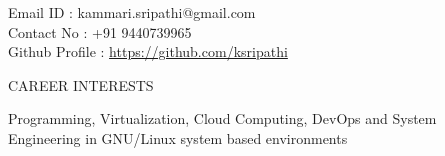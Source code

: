 \documentclass{resume} %
\newcommand{\blank}[1]{\hspace*{#1}}
\begin{document}
\blank{5 cm}
{Email ID} \blank{0.7 cm} :
kammari.sripathi@gmail.com \\
\blank{5 cm} 
{Contact No} \blank{0.3 cm} :
+91 9440739965 \\
\blank{5 cm}
{Github Profile : }
\url{https://github.com/ksripathi}
\sectionlineskip \hfill


\begin{rSection}{CAREER INTERESTS}
  
  { Programming, Virtualization, Cloud Computing, DevOps and System
    Engineering in GNU/Linux system based environments }

\end{rSection}

\end{document}
